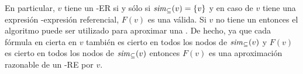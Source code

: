 %

En particular, $v$ tiene un \EL-ER si y s\'olo si ${\it sim}_\subseteq(v)=\{v\}$
y en caso de $v$ tiene una expresi\'on \EL-expresi\'on referencial, $F(v)$ es una v\'alida. Si $v$ no tiene un \posre entonces el algoritmo puede ser
utilizado para aproximar una \posre. De hecho, ya que cada f\'ormula en cierta en $v$
tambi\'en es cierto en todos los nodos de ${\it sim}_\subseteq(v)$ y $F(v)$
es cierto en todos los nodos de ${\it sim}_\subseteq(v)$ entonces $F(v)$ es una
aproximaci\'on razonable de un \EL-RE por $v$.

